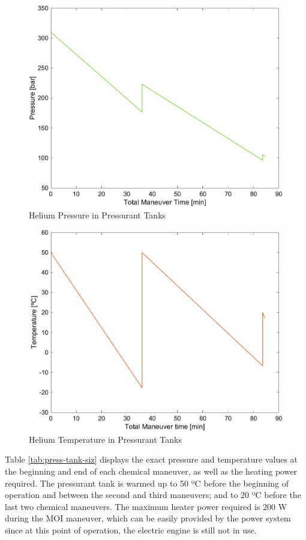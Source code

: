 \documentclass[conference]{IEEEtran}
\begin{document}
\begin{figure}[H]
  \centering
  \includegraphics[width=0.8\linewidth]{img/HelliumPressureHeTank.png}
  \caption{Helium Pressure in Pressurant Tanks}
  \label{fig:HePressureHeTank}
\end{figure}
\begin{figure}[H]
  \centering
  \includegraphics[width=0.8\linewidth]{img/HeliumTempHeTank.png}
  \caption{Helium Temperature in Pressurant Tanks}
  \label{fig:HeTempHeTank}
\end{figure}
Table \ref{tab:press-tank-siz} displays the exact pressure and temperature values at the beginning and end of each chemical maneuver, as well as the heating power required. The pressurant tank is warmed up to 50 ºC before the beginning of operation and between the second and third maneuvers; and to 20 ºC before the last two chemical maneuvers. The maximum heater power required is 200 W during the MOI maneuver, which can be easily provided by the power system since at this point of operation, the electric engine is still not in use.
\end{document}
